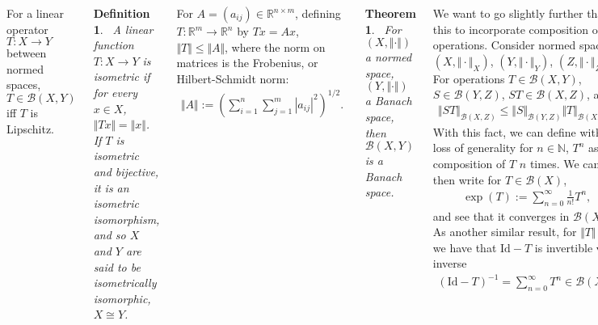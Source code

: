 \documentclass{tikzposter} %
\newtheorem{theorem}{Theorem}
\newtheorem{definition}{Definition}
\begin{document}
\begin{columns}
{    For a linear operator $T : X \to Y$ between normed spaces, $T \in \mathcal{B}(X,Y)$ iff $T$ is Lipschitz. \\

    \begin{definition}
    \ A linear function $T : X \to Y$ is isometric if for every $x \in X$, $\Vert Tx \Vert = \Vert x \Vert$. If $T$ is isometric and bijective, it is an isometric isomorphism, and so $X$ and $Y$ are said to be isometrically isomorphic, $X \cong Y$.
    \end{definition}
    \hphantom{}

    For $A = (a_{ij}) \in \mathbb{R}^{n \times m}$, defining $T : \mathbb{R}^{m} \to \mathbb{R}^{n}$ by $Tx = Ax$, $\Vert T \Vert \le \Vert A \Vert$, where the norm on matrices is the Frobenius, or Hilbert-Schmidt norm:
    \begin{align*}
      \Vert A \Vert := \left(\sum_{i=1}^{n} \sum_{j=1}^{m} |a_{ij}|^{2}\right)^{1/2}.
    \end{align*}

    \begin{theorem}
    \ For $(X, \Vert \cdot \Vert)$ a normed space, $(Y, \Vert \cdot \Vert)$ a Banach space, then $\mathcal{B}(X,Y)$ is a Banach space.
    \end{theorem}
    \hphantom{}

    We want to go slightly further than this to incorporate composition of operations. Consider normed spaces $(X, \Vert \cdot \Vert_{X})$, $(Y, \Vert \cdot \Vert_{Y})$, $(Z, \Vert \cdot \Vert_{Z})$. \\

    For operations $T \in \mathcal{B}(X,Y)$, $S \in \mathcal{B}(Y,Z)$, $ST \in \mathcal{B}(X,Z)$, and
    \begin{align*}
      \Vert ST \Vert_{\mathcal{B}(X,Z)} \le \Vert S \Vert_{\mathcal{B}(Y,Z)} \Vert T \Vert_{\mathcal{B}(X,Y)}.
    \end{align*}
    With this fact, we can define without loss of generality for $n \in \mathbb{N}$, $T^{n}$ as the composition of $T$ $n$ times. We can then write for $T \in \mathcal{B}(X)$,
    \begin{align*}
      \exp(T) := \sum_{n=0}^{\infty} \frac{1}{n!} T^{n},
    \end{align*}
    and see that it converges in $\mathcal{B}(X)$. \\

    As another similar result, for $\Vert T \Vert < 1$ we have that $\mathrm{Id} - T$ is invertible with inverse
    \begin{align*}
      (\mathrm{Id}-T)^{-1} = \sum_{n=0}^{\infty} T^{n} \in \mathcal{B}(X).
    \end{align*}

}
\end{columns}
\end{document}
